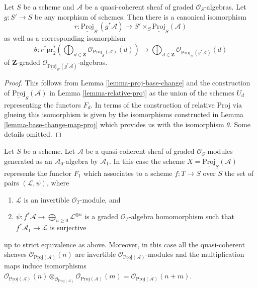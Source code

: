 \begin{lemma}
\label{lemma-relative-proj-base-change}
Let $S$ be a scheme and $\mathcal{A}$ be a quasi-coherent sheaf
of graded $\mathcal{O}_S$-algebras. Let $g : S' \to S$ be any morphism
of schemes. Then there is a canonical isomorphism
$$
r :
\underline{\text{Proj}}_{S'}(g^*\mathcal{A})
\longrightarrow
S' \times_S \underline{\text{Proj}}_S(\mathcal{A})
$$
as well as a corresponding isomorphism
$$
\theta :
r^*\text{pr}_2^*\left(\bigoplus\nolimits_{d \in \mathbf{Z}}
\mathcal{O}_{\underline{\text{Proj}}_S(\mathcal{A})}(d)\right)
\longrightarrow
\bigoplus\nolimits_{d \in \mathbf{Z}}
\mathcal{O}_{\underline{\text{Proj}}_{S'}(g^*\mathcal{A})}(d)
$$
of $\mathbf{Z}$-graded
$\mathcal{O}_{\underline{\text{Proj}}_{S'}(g^*\mathcal{A})}$-algebras.
\end{lemma}

\begin{proof}
This follows from Lemma \ref{lemma-proj-base-change} and the construction
of $\underline{\text{Proj}}_S(\mathcal{A})$ in
Lemma \ref{lemma-relative-proj} as the union
of the schemes $U_d$ representing the functors $F_d$.
In terms of the construction of relative Proj via glueing
this isomorphism is given by the isomorphisms constructed
in Lemma \ref{lemma-base-change-map-proj} which provides us with
the isomorphism $\theta$. Some details omitted.
\end{proof}

\begin{lemma}
\label{lemma-apply-relative}
Let $S$ be a scheme.
Let $\mathcal{A}$ be a quasi-coherent sheaf of graded $\mathcal{O}_S$-modules
generated as an $\mathcal{A}_0$-algebra by $\mathcal{A}_1$.
In this case the scheme $X = \underline{\text{Proj}}_S(\mathcal{A})$
represents the functor $F_1$ which associates to a scheme
$f : T \to S$ over $S$ the set of pairs $(\mathcal{L}, \psi)$, where
\begin{enumerate}
\item $\mathcal{L}$ is an invertible $\mathcal{O}_T$-module, and
\item $\psi : f^*\mathcal{A} \to \bigoplus_{n \geq 0} \mathcal{L}^{\otimes n}$
is a graded $\mathcal{O}_T$-algebra homomorphism such that
$f^*\mathcal{A}_1 \to \mathcal{L}$ is surjective
\end{enumerate}
up to strict equivalence as above. Moreover, in this case all the
quasi-coherent sheaves
$\mathcal{O}_{\underline{\text{Proj}}(\mathcal{A})}(n)$
are invertible
$\mathcal{O}_{\underline{\text{Proj}}(\mathcal{A})}$-modules
and the multiplication maps induce isomorphisms
$
\mathcal{O}_{\underline{\text{Proj}}(\mathcal{A})}(n)
\otimes_{\mathcal{O}_{\underline{\text{Proj}}(\mathcal{A})}}
\mathcal{O}_{\underline{\text{Proj}}(\mathcal{A})}(m) =
\mathcal{O}_{\underline{\text{Proj}}(\mathcal{A})}(n + m)$.
\end{lemma}

